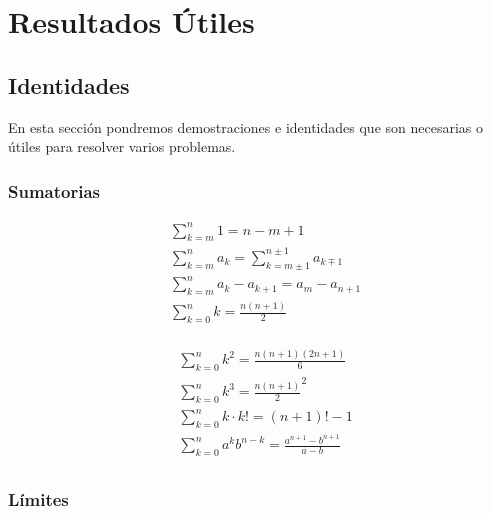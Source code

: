 \chapter{Resultados Útiles}

\section{Identidades}

En esta sección pondremos demostraciones e identidades que son necesarias o útiles para resolver varios problemas.

\subsection{Sumatorias}

\begin{minipage}{0.55\textwidth}
\begin{equation}
\begin{split}
    &\sum^{n}_{k=m} 1 = n - m + 1\\
    &\sum^{n}_{k=m} a_{k} = \sum^{n\pm 1}_{k=m\pm 1} a_{k\mp 1}\\
    &\sum^{n}_{k=m} a_{k} - a_{k+1} = a_{m} - a_{n+1}\\
    &\sum^{n}_{k=0} k = \frac{n(n+1)}{2}\\
\end{split}
\nonumber
\end{equation}
\end{minipage}
\begin{minipage}{0.55\textwidth}
\begin{equation}
\begin{split}
    &\sum^{n}_{k=0} k^{2} = \frac{n(n+1)(2n+1)}{6}\\
    &\sum^{n}_{k=0} k^{3} = {\frac{n(n+1)}{2}}^{2}\\
    &\sum^{n}_{k=0} k\cdot k! = (n+1)! - 1\\
    &\sum^{n}_{k=0} a^{k}b^{n-k} = \frac{a^{n+1}-b^{n+1}}{a-b}\\
\end{split}
\nonumber
\end{equation}
\end{minipage}

\subsection{Límites}

